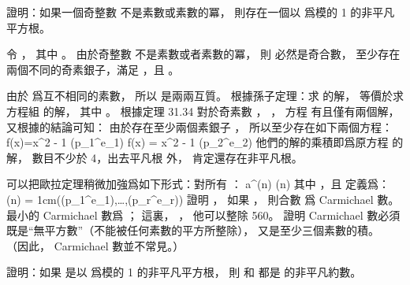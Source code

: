 \startsection[
  title={Primality testing},
]

\startEXERCISE
證明：如果一個奇整數  不是素數或素數的冪，
則存在一個以  爲模的 1 的非平凡平方根。
\stopEXERCISE

\startANSWER
令 ，
其中 。
由於奇整數  不是素數或者素數的冪，
則  必然是奇合數，
至少存在兩個不同的奇素銀子，滿足 ，且 。

由於  爲互不相同的素數，
所以  是兩兩互質。
根據孫子定理：求  的解，
等價於求方程組  的解，
其中 。
根據定理 31.34 對於奇素數 ， ，
方程  有且僅有兩個解，
又根據\inexercise[31.5-4] 的結論可知：
由於存在至少兩個素銀子 ，
所以至少存在如下兩個方程：
\startformula
f(x)=x^2 - 1  (\mod p_1^{e_1})
\stopformula
\startformula
f(x) = x^2 - 1  (\mod p_2^{e_2})
\stopformula
他們的解的乘積即爲原方程  的解，
數目不少於 4，出去平凡根  外，
肯定還存在非平凡根。
\stopANSWER

\startEXERCISE
可以把歐拉定理稍微加強爲如下形式：對所有 ：
\startformula
a^{\lambda(n)}  (\mod n)
\stopformula
其中 ，且  定義爲：
\startformula
\lambda(n) = 1cm(\phi(p_1^{e_1}),\ldots,\phi(p_r^{e_r}))
\stopformula
證明 ，
如果 ，
則合數  爲 Carmichael 數。
最小的 Carmichael 數爲 ；
這裏， ，
他可以整除 560。
證明 Carmichael 數必須既是“無平方數”（不能被任何素數的平方所整除），
又是至少三個素數的積。
（因此， Carmichael 數並不常見。）
\stopEXERCISE

\startANSWER
{}
\stopANSWER

\startEXERCISE
證明：如果  是以  爲模的 1 的非平凡平方根，
則  和  都是  的非平凡約數。
\stopEXERCISE

\startANSWER
{}
\stopANSWER

\stopsection
